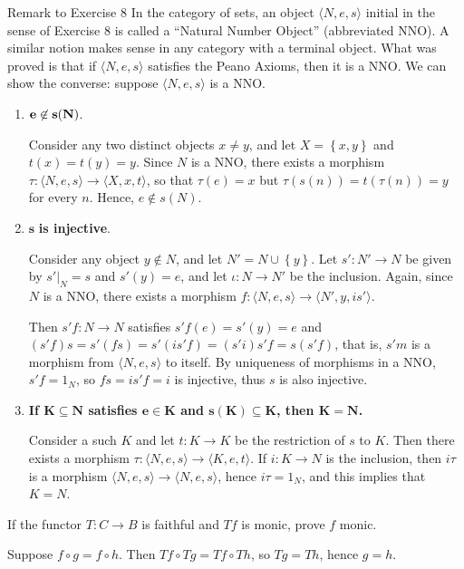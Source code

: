 \begin{denv*}{Remark to Exercise 8}
In the category of sets, an object $\langle N,e,s\rangle$ initial in the sense of Exercise 8 is called a ``Natural Number Object'' (abbreviated NNO). A similar notion makes sense in any category with a terminal object. What was proved is that if $\langle N,e,s\rangle$ satisfies the Peano Axioms, then it is a NNO. We can show the converse: suppose $\langle N,e,s\rangle$ is a NNO.
\begin{enumerate}
\item[\textbf{P1:}] $\bf e\not\in s(N)$.

	Consider any two distinct objects $x\neq y$, and let $X=\left\{x,y\right\}$ and $t(x)=t(y)=y$. Since $N$ is a NNO, there exists a morphism $\tau:\langle N,e,s\rangle\to\langle X,x,t\rangle$, so that $\tau(e)=x$ but $\tau(s(n))=t(\tau(n))=y$ for every $n$. Hence, $e\not\in s(N)$.
\item[\textbf{P2:}] $\mathbf{s}$\textbf{ is injective}.

	Consider any object $y\not \in N$, and let $N'=N\cup\left\{y\right\}$. Let $s':N'\to N$ be given by $s'|_N=s$ and $s'(y)=e$, and let $\iota\colon N\to N'$ be the inclusion. Again, since $N$ is a NNO, there exists a morphism $f:\langle N,e,s\rangle\to\langle N',y,is'\rangle$.

	Then $s'f:N\to N$ satisfies $s'f(e)=s'(y)=e$ and $(s'f)s=s'(fs)=s'(is'f)=(s'i)s'f=s(s'f)$, that is, $s'm$ is a morphism from $\langle N,e,s\rangle$ to itself. By uniqueness of morphisms in a NNO, $s'f=1_N$, so $fs=is'f=i$ is injective, thus $s$ is also injective.
\item[\textbf{P3:}] \textbf{If $\mathbf{K\subseteq N}$ satisfies $\mathbf{e\in K}$ and $\mathbf{s(K)\subseteq K}$, then $\mathbf{K=N}$.}

	Consider a such $K$ and let $t:K\to K$ be the restriction of $s$ to $K$. Then there exists a morphism $\tau:\langle N,e,s\rangle\to\langle K,e,t\rangle$. If $i:K\to N$ is the inclusion, then $i\tau$ is a morphism $\langle N,e,s\rangle\to\langle N,e,s\rangle$, hence $i\tau=1_N$, and this implies that $K=N$.
\end{enumerate}
\end{denv*}

\begin{exercise}
If the functor $T:C\to B$ is faithful and $Tf$ is monic, prove $f$ monic.
\end{exercise}
\begin{solution}
Suppose $f\circ g=f\circ h$. Then $Tf\circ Tg=Tf\circ Th$, so $Tg=Th$, hence $g=h$.
\end{solution}

